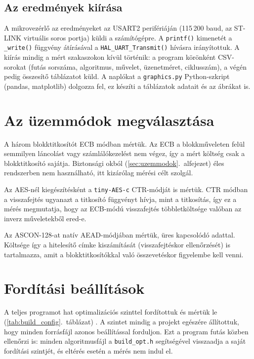 \documentclass[a4paper,12pt]{report}
\theoremstyle{definition}
\theoremstyle{remark}
\begin{document}
\subsection{Az eredmények kiírása}

A mikrovezérlő az eredményeket az USART2 perifériáján (115\,200 baud, az ST-LINK virtuális soros portja) küldi a számítógépre. A \texttt{printf()} kimenetét a \texttt{\_write()} függvény átírásával a \texttt{HAL\_UART\_Transmit()} hívásra irányítottuk. A kiírás mindig a mért szakaszokon kívül történik: a program körönként CSV-sorokat (futás sorszáma, algoritmus, művelet, üzenetméret, ciklusszám), a végén pedig összesítő táblázatot küld. A naplókat a \texttt{graphics.py} Python-szkript (pandas, matplotlib) dolgozza fel, ez készíti a táblázatok adatait és az ábrákat is.

\section{Az üzemmódok megválasztása}\label{sec:uzemmod_valasztas}

A három blokktitkosítót ECB módban mértük. Az ECB a blokkműveleten felül semmilyen láncolást vagy számlálókezelést nem végez, így a mért költség csak a blokktitkosító sajátja. Biztonsági okból (\ref{sec:uzemmodok}.~alfejezet) éles rendszerben nem használható, itt kizárólag mérési célt szolgál.

Az AES-nél kiegészítésként a \texttt{tiny-AES-c} CTR-módját is mértük. CTR módban a visszafejtés ugyanazt a titkosító függvényt hívja, mint a titkosítás, így ez a mérés megmutatja, hogy az ECB-módú visszafejtés többletköltsége valóban az inverz műveletekből ered-e.

Az ASCON-128-at natív AEAD-módjában mértük, üres kapcsolódó adattal. Költsége így a hitelesítő címke kiszámítását (visszafejtéskor ellenőrzését) is tartalmazza, amit a blokktitkosítókkal való összevetéskor figyelembe kell venni.

\section{Fordítási beállítások}\label{sec:forditas}

A teljes programot hat optimalizációs szinttel fordítottuk és mértük le (\ref{tab:build_config}.~táblázat) \cite{GCCopt}. A szintet mindig a projekt egészére állítottuk, hogy minden forrásfájl azonos beállítással forduljon. Ezt a program futás közben ellenőrzi is: minden algoritmusfájl a \texttt{build\_opt.h} segítségével visszaadja a saját fordítási szintjét, és eltérés esetén a mérés nem indul el.
\end{document}
